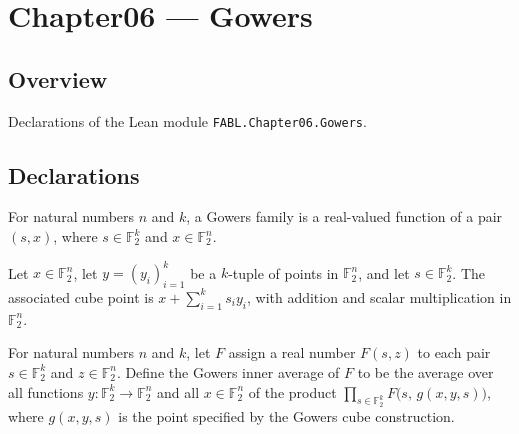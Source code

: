 \chapter{Chapter06 — Gowers}
\section{Overview}

Declarations of the Lean module \texttt{FABL.Chapter06.Gowers}.

\section{Declarations}

\begin{definition}
\label{FABL.GowersFamily}
\leanok
{}
For natural numbers $n$ and $k$, a Gowers family is a real-valued function of a pair
$(s,x)$, where $s\in\mathbb{F}_2^k$ and $x\in\mathbb{F}_2^n$.
\end{definition}

\begin{definition}
\label{FABL.gowersCubePoint}
\leanok
{}
Let $x\in\mathbb{F}_2^n$, let $y=(y_i)_{i=1}^k$ be a $k$-tuple of points in
$\mathbb{F}_2^n$, and let $s\in\mathbb{F}_2^k$. The associated cube point is
$x+\sum_{i=1}^k s_i y_i$, with addition and scalar multiplication in $\mathbb{F}_2^n$.
\end{definition}

\begin{definition}
\label{FABL.gowersInner}
\leanok
{}
For natural numbers $n$ and $k$, let $F$ assign a real number $F(s,z)$ to each pair
$s\in\mathbb{F}_2^k$ and $z\in\mathbb{F}_2^n$. Define the Gowers inner average of $F$ to
be the average over all functions $y\colon\mathbb{F}_2^k\to\mathbb{F}_2^n$ and all
$x\in\mathbb{F}_2^n$ of the product $\prod_{s\in\mathbb{F}_2^k}
F\bigl(s,\,g(x,y,s)\bigr)$, where $g(x,y,s)$ is the point specified by the Gowers cube
construction.
\end{definition}

